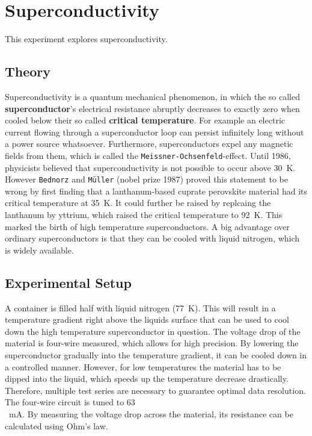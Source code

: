 \chapter{Superconductivity}
This experiment explores superconductivity.

\section{Theory}
Superconductivity is a quantum mechanical phenomenon, in which the so called \textbf{superconductor}'s electrical resistance abruptly decreases to exactly zero when cooled below their so called \textbf{critical temperature}.
For example an electric current flowing through a superconductor loop can persist infinitely long without a power source whatsoever.
Furthermore, superconductors expel any magnetic fields from them, which is called the \texttt{Meissner-Ochsenfeld}-effect.
Until 1986, physicists believed that superconductivity is not possible to occur above \SI{30}{\kelvin}.
However \texttt{Bednorz} and \texttt{Müller} (nobel prize 1987) proved this statement to be wrong by first finding that a lanthanum-based cuprate perovskite material had its critical temperature at \SI{35}{\kelvin}.
It could further be raised by replcaing the lanthanum by yttrium, which raised the critical temperature to \SI{92}{\kelvin}\cite{PhysRevLett.58.908}.
This marked the birth of high temperature superconductors.
A big advantage over ordinary superconductors is that they can be cooled with liquid nitrogen, which is widely available.

\section{Experimental Setup}
A container is filled half with liquid nitrogen (\SI{77}{\kelvin}).
This will result in a temperature gradient right above the liquids surface that can be used to cool down the high temperature superconductor in question.
The voltage drop of the material is four-wire measured, which allows for high precision.
By lowering the superconductor gradually into the temperature gradient, it can be cooled down in a controlled manner.
However, for low temperatures the material has to be dipped into the liquid, which speeds up the temperature decrease drastically.
Therefore, multiple test series are necessary to guarantee optimal data resolution.
The four-wire circuit is tuned to \SI{63}{\\mA}.
By measuring the voltage drop across the material, its resistance can be calculated using Ohm's law.


